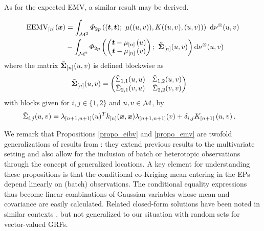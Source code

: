 \documentclass[aoas]{imsart}
\begin{document}
As for the expected EMV, a similar result may be derived.
\begin{propo}
\label{propo_emv}

\begin{equation*}
\begin{split}
\currentEEMV(\bm{x})
&=\int_{\domain^2} 
\varPhi_{2\no}
\left(
(\bt, \bt); ~ \mu((u,v)), 
K((u,v),(u,v))
\right) 
\
\mathrm{d}\mes^{\otimes} 
(u,v)\\
&-\int_{\domain^2} \varPhi_{2\no}
\left(
\left(
\begin{matrix}
\bt-\currentMean{\uu}\\
\bt-\currentMean{\vv}
\end{matrix}
\right);~
\mathbf{\tilde{\Sigma}}_{[\stage]}(\uu, \vv)
\right)
\mathrm{d}\mes^{\otimes} 
(u,v)
\end{split}
\end{equation*}
where the matrix $\mathbf{\tilde{\Sigma}}_{[n]}(u, v)$ is defined blockwise as
\begin{equation*}
\begin{split}
\mathbf{\tilde{\Sigma}}_{[n]}(\uu, \vv)&=
\left(
\begin{matrix}
\tilde{\Sigma}_{1,1}(\uu, \uu) & \tilde{\Sigma}_{1,2}(\uu, \vv)\\
\tilde{\Sigma}_{2,1}(\vv, \uu) & \tilde{\Sigma}_{2,2}(\vv, \vv)
\end{matrix}\right)
\end{split}
\end{equation*}
with blocks given for $i,j\in \{1,2\}$ and $u,v\in \mathcal{M}$, by
\begin{equation*}
\begin{split}
\tilde{\Sigma}_{i,j}(u, v) &= \lambda_{[n+1,n+1]}(\uu)^T k_{[n]}(\bm{x},\bm{x}) \lambda_{[n+1,n+1]}(\vv) + \delta_{i,j}\futureCov{\uu, \vv}.
\end{split}
\end{equation*}
\end{propo}

We remark that Propositions \ref{propo_eibv} and \ref{propo_emv} are
twofold generalizations of results from \cite{chevalier2014fast}: they
extend previous results to the multivariate setting and also allow for
the inclusion of batch or heterotopic observations through the concept
of generalized locations.  A key element for understanding these
propositions is that the conditional co-Kriging mean entering in the
EPs depend linearly on (batch) observations. The conditional equality
expressions thus become linear combinations of Gaussian variables
whose mean and covariance are easily calculated.  Related closed-form
solutions have been noted in similar contexts
\citep{bhattacharjya2013value,stroh}, but not generalized to our
situation with random sets for vector-valued GRFs.
\end{document}
